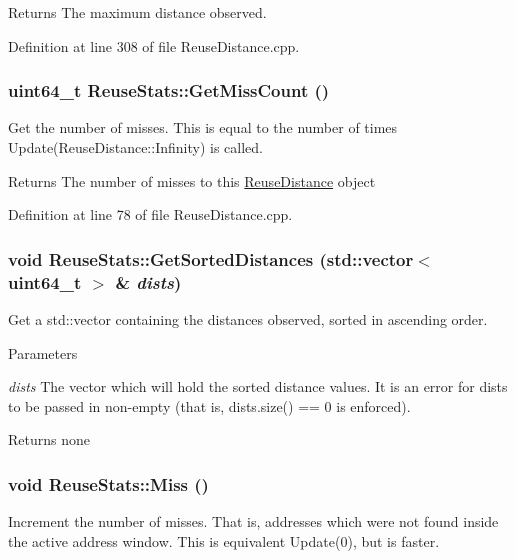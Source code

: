 \begin{DoxyReturn}{Returns}
The maximum distance observed. 
\end{DoxyReturn}


Definition at line 308 of file ReuseDistance.cpp.

\hypertarget{class_reuse_stats_aeff4f3fe0f2253e1aed432b18ec85d85}{
\subsubsection[{GetMissCount}]{\setlength{\rightskip}{0pt plus 5cm}uint64\_\-t ReuseStats::GetMissCount ()}}
\label{class_reuse_stats_aeff4f3fe0f2253e1aed432b18ec85d85}
Get the number of misses. This is equal to the number of times Update(ReuseDistance::Infinity) is called.

\begin{DoxyReturn}{Returns}
The number of misses to this \hyperlink{class_reuse_distance}{ReuseDistance} object 
\end{DoxyReturn}


Definition at line 78 of file ReuseDistance.cpp.

\hypertarget{class_reuse_stats_adcb657e303c090ac5ef210f6c4506986}{
\subsubsection[{GetSortedDistances}]{\setlength{\rightskip}{0pt plus 5cm}void ReuseStats::GetSortedDistances (std::vector$<$ uint64\_\-t $>$ \& {\em dists})}}
\label{class_reuse_stats_adcb657e303c090ac5ef210f6c4506986}
Get a std::vector containing the distances observed, sorted in ascending order.


\begin{DoxyParams}{Parameters}
\item[{\em dists}]The vector which will hold the sorted distance values. It is an error for dists to be passed in non-\/empty (that is, dists.size() == 0 is enforced).\end{DoxyParams}
\begin{DoxyReturn}{Returns}
none 
\end{DoxyReturn}
\hypertarget{class_reuse_stats_a3d963a3b6c2c0b37b23d4e0723a70831}{
\subsubsection[{Miss}]{\setlength{\rightskip}{0pt plus 5cm}void ReuseStats::Miss ()}}
\label{class_reuse_stats_a3d963a3b6c2c0b37b23d4e0723a70831}
Increment the number of misses. That is, addresses which were not found inside the active address window. This is equivalent Update(0), but is faster.

